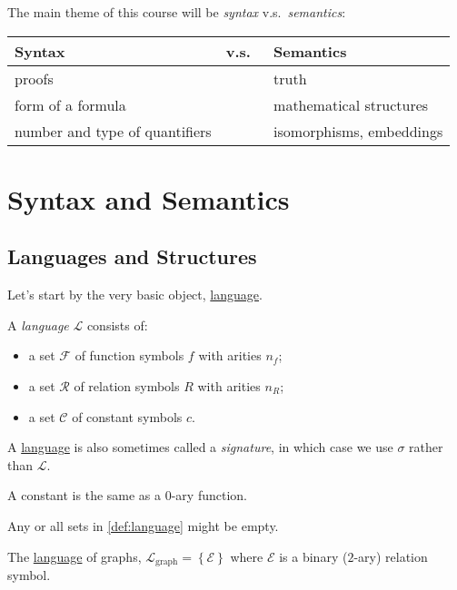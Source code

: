 The main theme of this course will be \emph{syntax} v.s.\ \emph{semantics}:
\begin{table}[H]
	\centering
	\begin{tabular}{lcl}
		\toprule
		Syntax                         & v.s.\  & Semantics                \\
		\midrule
		proofs                         &        & truth                    \\
		form of a formula              &        & mathematical structures  \\
		number and type of quantifiers &        & isomorphisms, embeddings \\
		\bottomrule
	\end{tabular}
\end{table}

\section{Syntax and Semantics}
\subsection{Languages and Structures}
Let's start by the very basic object, \hyperref[def:language]{language}.
\begin{definition}[Language]\label{def:language}
	A \emph{language} \(\mathcal{L} \) consists of:
	\begin{itemize}
		\item a set \(\mathcal{F} \) of function symbols \(f\) with arities \(n_f\);
		\item a set \(\mathcal{R} \) of relation symbols \(R\) with arities \(n_R\);
		\item a set \(\mathcal{C} \) of constant symbols \(c\).
	\end{itemize}
\end{definition}

A \hyperref[def:language]{language} is also sometimes called a \emph{signature}, in which case we use \(\sigma \) rather than \(\mathcal{L} \).

\begin{note}
	A constant is the same as a \(0\)-ary function.
\end{note}

\begin{remark}
	Any or all sets in \autoref{def:language} might be empty.
\end{remark}

\begin{eg}[Graph]\label{eg:language-graph}
	The \hyperref[def:language]{language} of graphs, \(\mathcal{L} _{\text{graph} } = \left\{ \mathcal{E} \right\}\) where \(\mathcal{E} \) is a binary (\(2\)-ary) relation symbol.
\end{eg}

